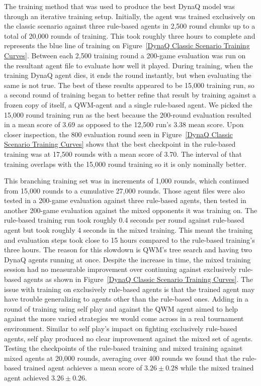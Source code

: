 \documentclass[article, 10pt]{IEEEtran}
\begin{document}
The training method that was used to produce the best DynaQ model was through an iterative training setup. Initially, the agent was trained exclusively on the classic scenario against three rule-based agents in 2,500 round chunks up to a total of 20,000 rounds of training. This took roughly three hours to complete and represents the blue line of training on Figure~\ref{DynaQ Classic Scenario Training Curves}. Between each 2,500 training round a 200-game evaluation was run on the resultant agent file to evaluate how well it played. During training, when the training DynaQ agent dies, it ends the round instantly, but when evaluating the same is not true. The best of these results appeared to be 15,000 training run, so a second round of training began to better refine that result by training against a frozen copy of itself, a QWM-agent and a single rule-based agent. We picked the 15,000 round training run as the best because the 200-round evaluation resulted in a mean score of 3.69 as opposed to the 12,500 run's 3.38 mean score. Upon closer inspection, the 800 evaluation round seen in Figure~\ref{DynaQ Classic Scenario Training Curves} shows that the best checkpoint in the rule-based training was at 17,500 rounds with a mean score of 3.70. The interval of that training overlaps with the 15,000 round training so it is only nominally better. 

This branching training set was in increments of 1,000 rounds, which continued from 15,000 rounds to a cumulative 27,000 rounds. Those agent files were also tested in a 200-game evaluation against three rule-based agents, then tested in another 200-game evaluation against the mixed opponents it was training on. The rule-based training run took roughly 0.4 seconds per round against rule-based agent but took roughly 4 seconds in the mixed training. This meant the training and evaluation steps took close to 15 hours compared to the rule-based training's three hours. The reason for this slowdown is QWM's tree search and having two DynaQ agents running at once. Despite the increase in time, the mixed training session had no measurable improvement over continuing against exclusively rule-based agents as shown in Figure~\ref{DynaQ Classic Scenario Training Curves}. The issue with training on exclusively rule-based agents is that the trained agent may have trouble generalizing to agents other than the rule-based ones. Adding in a round of training using self play and against the QWM agent aimed to help against the more varied strategies we would come across in a real tournament environment. Similar to self play's impact on fighting exclusively rule-based agents, self play produced no clear improvement against the mixed set of agents. Testing the checkpoints of the rule-based training and mixed training against mixed agents at 20,000 rounds, averaging over 400 rounds we found that the rule-based trained agent achieves a mean score of $3.26 \pm 0.28$ while the mixed trained agent achieved $3.26 \pm 0.26$.
\end{document}
